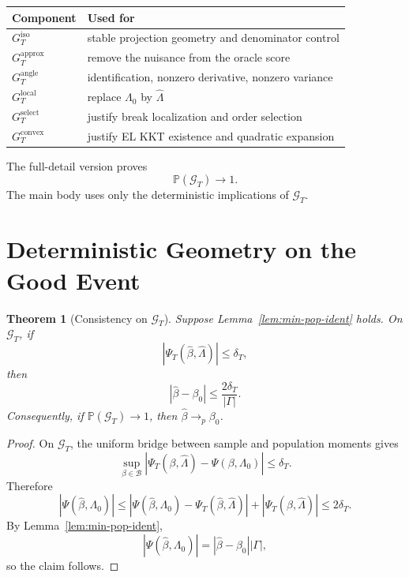\documentclass[12pt]{article}
\numberwithin{equation}{section}
\newtheorem{theorem}{Theorem}
\theoremstyle{definition}
\newcommand{\Pp}{\mathbb P}
\begin{document}
\begin{center}
\begin{tabular}{p{}p{}}
\toprule
Component & Used for \\
\midrule
\(G_T^{\mathrm{iso}}\) & stable projection geometry and denominator control \\
\(G_T^{\mathrm{approx}}\) & remove the nuisance from the oracle score \\
\(G_T^{\mathrm{angle}}\) & identification, nonzero derivative, nonzero variance \\
\(G_T^{\mathrm{local}}\) & replace \(\Lambda_0\) by \(\widehat\Lambda\) \\
\(G_T^{\mathrm{select}}\) & justify break localization and order selection \\
\(G_T^{\mathrm{convex}}\) & justify EL KKT existence and quadratic expansion \\
\bottomrule
\end{tabular}
\end{center}

The full-detail version proves
\[
    \Pp(\mathcal G_T)\to1.
\]
The main body uses only the deterministic implications of \(\mathcal G_T\).

\section{Deterministic Geometry on the Good Event}

\begin{theorem}[Consistency on \(\mathcal G_T\)]
\label{thm:min-consistency}
Suppose Lemma~\ref{lem:min-pop-ident} holds. On \(\mathcal G_T\), if
\[
    |\Psi_T(\widehat\beta,\widehat\Lambda)|\le\delta_T,
\]
then
\[
    |\widehat\beta-\beta_0|\le \frac{2\delta_T}{|\Gamma|}.
\]
Consequently, if \(\Pp(\mathcal G_T)\to1\), then
\(\widehat\beta\to_p\beta_0\).
\end{theorem}

\begin{proof}
On \(\mathcal G_T\), the uniform bridge between sample and population moments
gives
\[
    \sup_{\beta\in\mathcal B}
    |\Psi_T(\beta,\widehat\Lambda)-\Psi(\beta,\Lambda_0)|\le\delta_T.
\]
Therefore
\[
    |\Psi(\widehat\beta,\Lambda_0)|
    \le
    |\Psi(\widehat\beta,\Lambda_0)-\Psi_T(\widehat\beta,\widehat\Lambda)|
    +|\Psi_T(\widehat\beta,\widehat\Lambda)|
    \le 2\delta_T.
\]
By Lemma~\ref{lem:min-pop-ident},
\[
    |\Psi(\widehat\beta,\Lambda_0)|
    =
    |\widehat\beta-\beta_0||\Gamma|,
\]
so the claim follows.
\end{proof}
\end{document}
